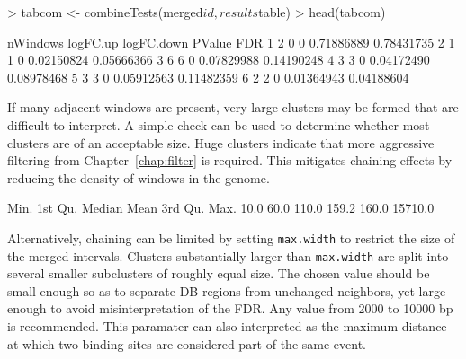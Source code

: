 \documentclass[12pt]{report}
\renewenvironment{Schunk}{\vspace{0pt}}{\vspace{0pt}}
\newcommand{\code}[1]{{\small\texttt{#1}}}
\begin{document}
\begin{Schunk}
\begin{Sinput}
> tabcom <- combineTests(merged$id, results$table)
> head(tabcom)
\end{Sinput}
\begin{Soutput}
  nWindows logFC.up logFC.down     PValue        FDR
1        2        0          0 0.71886889 0.78431735
2        1        1          0 0.02150824 0.05666366
3        6        6          0 0.07829988 0.14190248
4        3        3          0 0.04172490 0.08978468
5        3        3          0 0.05912563 0.11482359
6        2        2          0 0.01364943 0.04188604
\end{Soutput}
\end{Schunk}

If many adjacent windows are present, very large clusters may be formed that are difficult to interpret. 
A simple check can be used to determine whether most clusters are of an acceptable size. 
Huge clusters indicate that more aggressive filtering from Chapter~\ref{chap:filter} is required.  
This mitigates chaining effects by reducing the density of windows in the genome.


\begin{Schunk}
\begin{Soutput}
   Min. 1st Qu.  Median    Mean 3rd Qu.    Max. 
   10.0    60.0   110.0   159.2   160.0 15710.0 
\end{Soutput}
\end{Schunk}

Alternatively, chaining can be limited by setting \code{max.width} to restrict the size of the merged intervals. 
Clusters substantially larger than \code{max.width} are split into several smaller subclusters of roughly equal size.
The chosen value should be small enough so as to separate DB regions from unchanged neighbors, yet large enough to avoid misinterpretation of the FDR.
Any value from 2000 to 10000 bp is recommended. 
This paramater can also interpreted as the maximum distance at which two binding sites are considered part of the same event.
\end{document}
